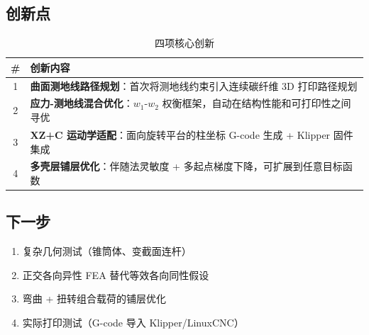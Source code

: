 \documentclass[11pt,a4paper]{article}
\begin{document}
\noindent{}

\subsection{创新点}

\begin{table}[H]
\centering
\begin{tabularx}{\textwidth}{c X}
\toprule
\textbf{\#} & \textbf{创新内容} \\
\midrule
1 & \textbf{曲面测地线路径规划}：首次将测地线约束引入连续碳纤维 3D 打印路径规划 \\
2 & \textbf{应力-测地线混合优化}：$w_1$-$w_2$ 权衡框架，自动在结构性能和可打印性之间寻优 \\
3 & \textbf{XZ+C 运动学适配}：面向旋转平台的柱坐标 G-code 生成 + Klipper 固件集成 \\
4 & \textbf{多壳层铺层优化}：伴随法灵敏度 + 多起点梯度下降，可扩展到任意目标函数 \\
\bottomrule
\end{tabularx}
\caption{四项核心创新}
\end{table}

\subsection{下一步}

\begin{enumerate}[nosep]
\item 复杂几何测试（锥筒体、变截面连杆）
\item 正交各向异性 FEA 替代等效各向同性假设
\item 弯曲 + 扭转组合载荷的铺层优化
\item 实际打印测试（G-code 导入 Klipper/LinuxCNC）
\end{enumerate}
\end{document}
